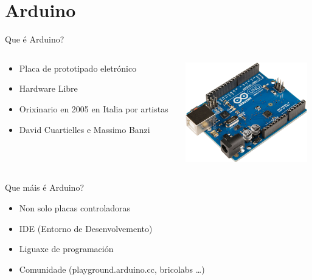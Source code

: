 \documentclass{beamer}
\begin{document}
\section{Arduino}
\begin{frame}
\huge{\centerline{\textbf{\color{blue} \insertsection}}}
\end{frame}


\begin{frame}{Que é Arduino?}
\begin{columns}
\begin{column}{0.5\textwidth}
	\begin{itemize}
	\item Placa de prototipado eletrónico
	\item Hardware Libre
	\item Orixinario en 2005 en Italia por artistas
	\item David Cuartielles e Massimo Banzi
	\end{itemize}
\end{column}
\begin{column}{0.5\textwidth}
	\includegraphics[width=150pt]{./img/Arduino_Uno.png}
\end{column}
\end{columns}

\end{frame}

%

\begin{frame}{Que máis é Arduino?}
\begin{itemize}
 \item Non solo placas controladoras
 \item IDE (Entorno de Desenvolvemento)
 \item Liguaxe de programación
 \item Comunidade (playground.arduino.cc, bricolabs \dots)
\end{itemize}

\end{frame}
\end{document}
